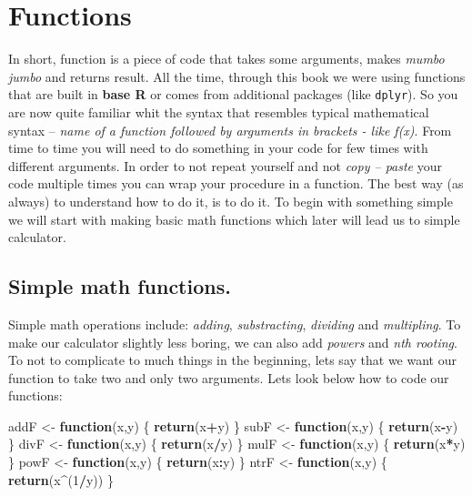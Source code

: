 \documentclass[]{book}
\newenvironment{Shaded}{\begin{snugshade}}{\end{snugshade}}
\newcommand{\KeywordTok}[1]{\textcolor[rgb]{0.13,0.29,0.53}{\textbf{#1}}}
\newcommand{\DecValTok}[1]{\textcolor[rgb]{0.00,0.00,0.81}{#1}}
\newcommand{\StringTok}[1]{\textcolor[rgb]{0.31,0.60,0.02}{#1}}
\newcommand{\ControlFlowTok}[1]{\textcolor[rgb]{0.13,0.29,0.53}{\textbf{#1}}}
\newcommand{\OperatorTok}[1]{\textcolor[rgb]{0.81,0.36,0.00}{\textbf{#1}}}
\newcommand{\NormalTok}[1]{#1}
\theoremstyle{definition}
\theoremstyle{definition}
\theoremstyle{definition}
\theoremstyle{remark}
\begin{document}
\chapter{Functions}\label{funcs}

In short, function is a piece of code that takes some arguments, makes
\emph{mumbo jumbo} and returns result. All the time, through this book
we were using functions that are built in \textbf{base R} or comes from
additional packages (like \texttt{dplyr}). So you are now quite familiar
whit the syntax that resembles typical mathematical syntax -- \emph{name
of a function followed by arguments in brackets - like f(x)}. From time
to time you will need to do something in your code for few times with
different arguments. In order to not repeat yourself and not \emph{copy
-- paste} your code multiple times you can wrap your procedure in a
function. The best way (as always) to understand how to do it, is to do
it. To begin with something simple we will start with making basic math
functions which later will lead us to simple calculator.

\section{Simple math functions.}\label{simple-math-functions.}

Simple math operations include: \emph{adding}, \emph{substracting},
\emph{dividing} and \emph{multipling}. To make our calculator slightly
less boring, we can also add \emph{powers} and \emph{nth rooting}. To
not to complicate to much things in the beginning, lets say that we want
our function to take two and only two arguments. Lets look below how to
code our functions:

\begin{Shaded}
\begin{Highlighting}[]
\NormalTok{addF <-}\StringTok{ }\ControlFlowTok{function}\NormalTok{(x,y) \{}
  \KeywordTok{return}\NormalTok{(x}\OperatorTok{+}\NormalTok{y)}
\NormalTok{\}}
\NormalTok{subF <-}\StringTok{ }\ControlFlowTok{function}\NormalTok{(x,y) \{}
  \KeywordTok{return}\NormalTok{(x}\OperatorTok{-}\NormalTok{y)}
\NormalTok{\}}
\NormalTok{divF <-}\StringTok{ }\ControlFlowTok{function}\NormalTok{(x,y) \{}
  \KeywordTok{return}\NormalTok{(x}\OperatorTok{/}\NormalTok{y)}
\NormalTok{\}}
\NormalTok{mulF <-}\StringTok{ }\ControlFlowTok{function}\NormalTok{(x,y) \{}
  \KeywordTok{return}\NormalTok{(x}\OperatorTok{*}\NormalTok{y)}
\NormalTok{\}}
\NormalTok{powF <-}\StringTok{ }\ControlFlowTok{function}\NormalTok{(x,y) \{}
  \KeywordTok{return}\NormalTok{(x}\OperatorTok{:}\NormalTok{y)}
\NormalTok{\}}
\NormalTok{ntrF <-}\StringTok{ }\ControlFlowTok{function}\NormalTok{(x,y) \{}
  \KeywordTok{return}\NormalTok{(x}\OperatorTok{^}\NormalTok{(}\DecValTok{1}\OperatorTok{/}\NormalTok{y))}
\NormalTok{\}}
\end{Highlighting}
\end{Shaded}
\end{document}
